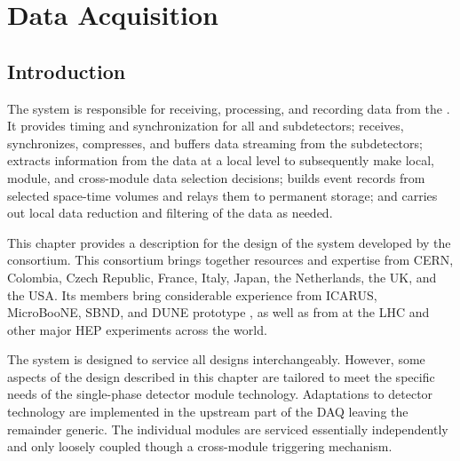 \chapter{Data Acquisition}
\label{ch:sp-daq}


\section{Introduction}
\label{sec:fd-daq:introduction}

The   system is responsible for receiving,
processing, and recording data from the  .
It provides
timing and synchronization for all  and
subdetectors; receives, synchronizes, compresses, and buffers data
streaming from the subdetectors; extracts information from the data at a
local level to subsequently make local, module, and cross-module data
selection decisions; builds event records %
 from selected space-time volumes 
and relays them to permanent storage; and carries out local data
reduction and filtering of the data as needed.

This chapter provides a description for the design of the 
  system developed by the  
 consortium. 
This consortium brings together resources and expertise from CERN,
Colombia, Czech Republic, France, Italy, Japan, the Netherlands, the UK, and the USA. 
Its members bring considerable experience from ICARUS, MicroBooNE,
SBND, and
DUNE prototype , as well as from  at the LHC and other major
HEP experiments across the world.

The system is designed to service all   designs interchangeably. 
However, some aspects of the  design described in this chapter are tailored to meet the specific needs of the single-phase detector module technology. 
Adaptations to detector technology are implemented in the upstream part of the DAQ leaving the remainder generic.
The individual modules are serviced essentially independently and only loosely coupled though a cross-module triggering mechanism.


